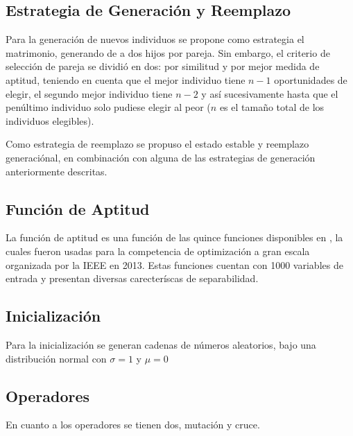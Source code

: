 \documentclass{llncs}
\begin{document}
\subsection{Estrategia de Generación y Reemplazo}
Para la generación de nuevos individuos se propone como estrategia el matrimonio, generando de a dos hijos por pareja. Sin embargo, el criterio de selección de pareja se dividió en dos: por similitud y por mejor medida de aptitud, teniendo en cuenta que el mejor individuo tiene $n-1$ oportunidades de elegir, el segundo mejor individuo tiene $n-2$ y así sucesivamente hasta que el penúltimo individuo solo pudiese elegir al peor ($n$ es el tamaño total de los individuos elegibles).

Como estrategia de reemplazo se propuso el estado estable y reemplazo generaciónal, en combinación con alguna de las estrategias de generación anteriormente descritas.

\subsection{Función de Aptitud}
La función de aptitud es una función de las quince funciones disponibles en \cite{IEEE:CEC} , la cuales fueron usadas para la competencia de optimización a gran escala organizada por la IEEE en 2013. 
Estas funciones cuentan con 1000 variables de entrada y presentan diversas carecteríscas de separabilidad.
\subsection{Inicialización}
Para la inicialización se generan cadenas de números aleatorios, bajo una distribución normal con $\sigma=1$ y $\mu=0$ 

\subsection{Operadores}
En cuanto a los operadores se tienen dos, mutación y cruce. 
\end{document}
